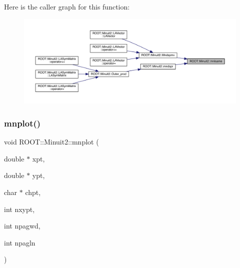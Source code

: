 Here is the caller graph for this function\+:
\nopagebreak
\begin{figure}[H]
\begin{center}
\leavevmode
\includegraphics[width=350pt]{d6/d3a/namespaceROOT_1_1Minuit2_a3f90b826c2c1b4313f9a90c22b8ee657_icgraph}
\end{center}
\end{figure}
\mbox{\label{namespaceROOT_1_1Minuit2_a2c786d8330736525f0757ba1848f5bc4}} 
\subsubsection{\texorpdfstring{mnplot()}{mnplot()}}
{\footnotesize\ttfamily void R\+O\+O\+T\+::\+Minuit2\+::mnplot (\begin{DoxyParamCaption}\item[{double $\ast$}]{xpt,  }\item[{double $\ast$}]{ypt,  }\item[{char $\ast$}]{chpt,  }\item[{int}]{nxypt,  }\item[{int}]{npagwd,  }\item[{int}]{npagln }\end{DoxyParamCaption})}

